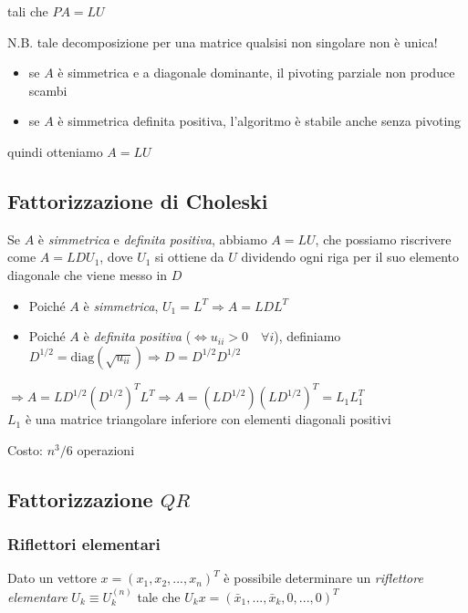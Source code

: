 \documentclass[openany]{book}
\begin{document}
tali che $PA=LU $

N.B. tale decomposizione per una matrice qualsisi non singolare non è unica!

\begin{itemize}
	\item se $A$ è simmetrica e a diagonale dominante, il pivoting parziale non produce scambi
	\item se $ A$ è simmetrica definita positiva, l'algoritmo è stabile anche senza pivoting
\end{itemize}

quindi otteniamo $A=LU$
\subsection {Fattorizzazione di Choleski}

Se $A$ è \textit{simmetrica} e \textit{definita positiva}, abbiamo $A=LU$, che possiamo riscrivere come 
$A=LDU_1$, dove $U_1$ si ottiene da $U$ dividendo ogni riga per il suo elemento diagonale che viene messo in $D$

\begin{itemize}
	\item Poiché $A$ è \textit{simmetrica}, $U_1 = L^T \Rightarrow A=LDL^T$ 
	\item Poiché $A$ è \textit{definita positiva} ($\Leftrightarrow u_{ii}>0 \quad \forall i$), definiamo 
	$D^{1/2}=\text {diag}(\sqrt {u_{ii}})\Rightarrow D=D^{1/2}D^{1/2}$

\end{itemize}

$\Rightarrow A=LD^{1/2}(D^{1/2})^T L^T\Rightarrow A=(LD^{1/2})(LD^{1/2})^T=L_1L_1^T$
\\

$L_1$ è una matrice triangolare inferiore con elementi diagonali positivi

Costo: $n^3/6$ operazioni
\subsection {Fattorizzazione $QR$}

\subsubsection {Riflettori elementari}

Dato un vettore $x=(x_1,x_2,...,x_n)^T$ è possibile determinare un \textit{riflettore elementare} $U_k \equiv 
U_k^{(n)}$ tale che $U_kx=(\bar{x}_1,...,\bar{x}_k,0,...,0)^T$
\\
\end{document}
